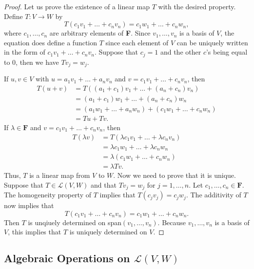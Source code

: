 \documentclass[11pt]{article}
\begin{document}
    \begin{proof}
        Let us prove the existence of a linear map $T$ with the desired property. Define \(T:V \rightarrow W\) by \[T(c_1 v_1 + \dots + c_n v_n) = c_1 w_1 + \dots + c_n w_n,\] where \(c_1, \dots, c_n\) are arbitrary elements of \textbf{F}. Since \(v_1, \dots, v_n\) is a basis of $V$, the equation does define a function $T$ since each element of $V$ can be uniquely written in the form of \(c_1 v_1 + \dots + c_n v_n\). Suppose that \(c_j = 1\) and the other $c$'s being equal to 0, then we have \(Tv_j = w_j\).

        \vspace{1em}
        
        If \(u,v \in V\) with \(u = a_1 v_1 + \dots + a_n v_n\) and \(v = c_1 v_1 + \dots + c_n v_n\), then 
        \begin{align*}
            T(u + v) &= T((a_1 + c_1)v_1 + \dots + (a_n + c_n)v_n) \\
                     &= (a_1 + c_1)w_1 + \dots + (a_n + c_n) w_n \\
                     &= (a_1 w_1 + \dots + a_n w_n) + (c_1 w_1 + \dots + c_n w_n) \\
                     &= Tu + Tv.
        \end{align*}
        If \(\lambda \in \textbf{F}\) and \(v = c_1 v_1 + \dots + c_n v_n\), then
        \begin{align*}
            T(\lambda v) &= T(\lambda c_1 v_1 + \dots + \lambda c_n v_n) \\
                         &= \lambda c_1 w_1 + \dots + \lambda c_n w_n \\
                         &= \lambda (c_1 w_1 + \dots + c_n w_n) \\
                         &= \lambda Tv.
        \end{align*}
        Thus, $T$ is a linear map from $V$ to $W$. Now we need to prove that it is unique. Suppose that \(T \in \mathcal{L}(V,W)\) and that \(Tv_j = w_j\) for \(j = 1, \dots, n\). Let \(c_1, \dots, c_n \in \textbf{F}\). The homogeneity property of $T$ implies that \(T(c_j v_j) = c_j w_j\). The additivity of $T$ now implies that \[T(c_1 v_1 + \dots + c_n v_n) = c_1 w_1 + \dots + c_n w_n.\] Then $T$ is unqiuely determined on span\((v_1, \dots,v_n)\). Because \(v_1, \dots, v_n\) is a basis of $V$, this implies that $T$ is uniquely determined on $V$.
    \end{proof}


    \subsection{Algebraic Operations on \(\mathcal{L}(V,W)\)}
\end{document}
